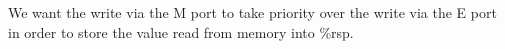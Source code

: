 \documentclass{article}
\begin{document}
We want the write via the M port to take priority over the write via the E port
in order to store the value read from memory into \%rsp.
\end{document}
